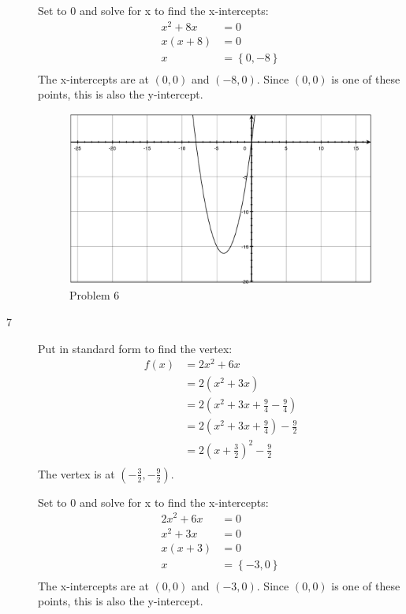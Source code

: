 \documentclass{exam}
\begin{document}
\begin{description}
      Set to 0 and solve for x to find the x-intercepts:
      \begin{align*}
        x^2 + 8x &= 0 \\
        x(x + 8) &= 0 \\
        x        &= \left\{ 0, -8 \right\} \\
      \end{align*}
      The x-intercepts are at $(0, 0)$ and $(-8, 0)$.  Since $(0, 0)$ is one of these points, this is also the y-intercept.

      \begin{figure}[H]
        \centering
        \includegraphics[scale=.3]{problem_06.eps}
        \caption*{Problem 6}
      \end{figure}

    \item[7]
      Put in standard form to find the vertex:
      \begin{align*}
        f(x) &= 2x^2 + 6x \\
             &= 2(x^2 + 3x) \\
             &= 2 \left( x^2 + 3x + \frac{9}{4} - \frac{9}{4} \right) \\
             &= 2 \left( x^2 + 3x + \frac{9}{4} \right) - \frac{9}{2} \\
             &= 2 \left( x + \frac{3}{2} \right)^2 - \frac{9}{2} \\
      \end{align*}
      The vertex is at $\left( -\frac{3}{2}, -\frac{9}{2} \right)$.

      Set to 0 and solve for x to find the x-intercepts:
      \begin{align*}
        2x^2 + 6x &= 0 \\
        x^2 + 3x  &= 0 \\
        x(x + 3)  &= 0 \\
        x         &= \left\{ -3, 0 \right\} \\
      \end{align*}
      The x-intercepts are at $(0, 0)$ and $(-3, 0)$.  Since $(0, 0)$ is one of these points, this is also the y-intercept.


\end{description}
\end{document}
